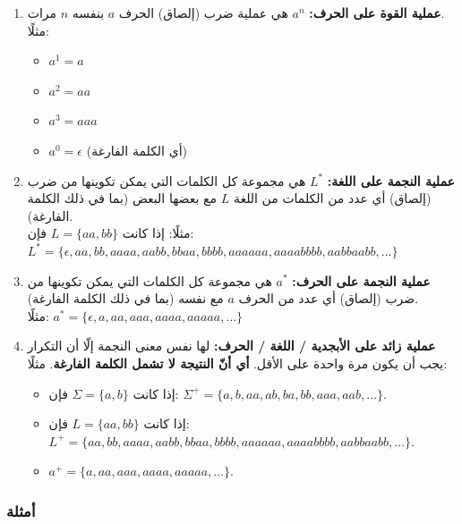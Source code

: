 ﻿\documentclass[12pt]{article}
\begin{document}
\begin{enumerate}
\item
    \textbf{عملية القوة على الحرف:} $a^n$ هي عملية ضرب (إلصاق) الحرف $a$ بنفسه $n$ مرات. \\
    مثلًا:
    \begin{itemize}
        \item $a^1 = a$
        \item $a^2 = aa$
        \item $a^3 = aaa$
        \item $a^0 = \epsilon$ (أي الكلمة الفارغة)
    \end{itemize}

\item
    \textbf{عملية النجمة على اللغة:} $L^*$ هي مجموعة كل الكلمات التي يمكن تكوينها من ضرب (إلصاق) أي عدد من الكلمات من اللغة $L$ مع بعضها البعض (بما في ذلك الكلمة الفارغة). \\
    مثلًا: إذا كانت $L = \{aa,bb\}$ فإن: \\
    $L^* = \{\epsilon, aa, bb, aaaa, aabb, bbaa, bbbb, aaaaaa, aaaabbbb, aabbaabb, \dots\}$

\item
    \textbf{عملية النجمة على الحرف:} $a^*$ هي مجموعة كل الكلمات التي يمكن تكوينها من ضرب (إلصاق) أي عدد من الحرف $a$ مع نفسه (بما في ذلك الكلمة الفارغة). \\
    مثلًا: $a^* = \{\epsilon, a, aa, aaa, aaaa, aaaaa, \dots\}$

\item \textbf{عملية زائد على الأبجدية / اللغة / الحرف:}
    لها نفس معنى النجمة إلّا أن التكرار يجب أن يكون مرة واحدة على الأقل.
    \textbf{أي أنّ النتيجة لا تشمل الكلمة الفارغة}.
    مثلًا:
    \begin{itemize}
        \item إذا كانت $\Sigma = \{a,b\}$ فإن: $\Sigma^+ = \{a, b, aa, ab, ba, bb, aaa, aab, \dots\}$.
        \item إذا كانت $L = \{aa,bb\}$ فإن:\\
        $L^+ = \{aa, bb, aaaa, aabb, bbaa, bbbb, aaaaaa, aaaabbbb, aabbaabb, \dots\}$.
        \item $a^+ = \{a, aa, aaa, aaaa, aaaaa, \dots\}$.
    \end{itemize}

\end{enumerate}

\subsubsection{أمثلة}
\end{document}
